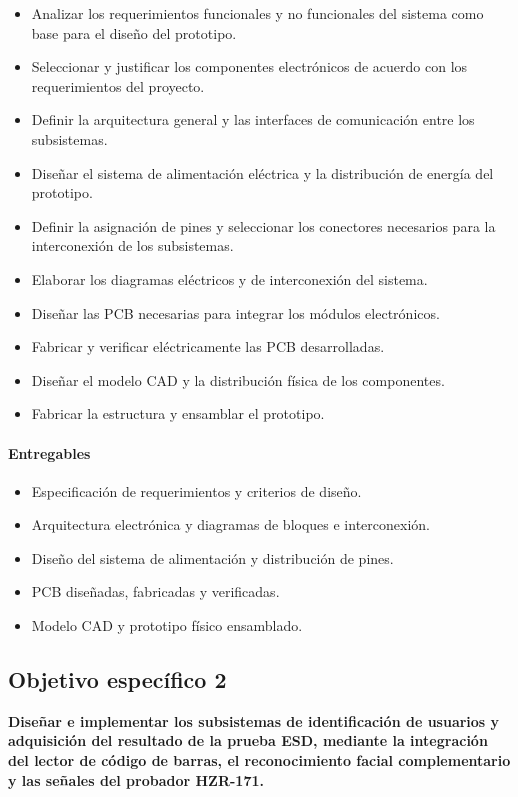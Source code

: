 \begin{itemize}
\item Analizar los requerimientos funcionales y 
no funcionales del sistema como base para el diseño del prototipo.
\item Seleccionar y justificar los componentes electrónicos de acuerdo con los
requerimientos del proyecto.
\item Definir la arquitectura general y las interfaces de comunicación entre
los subsistemas.
\item Diseñar el sistema de alimentación eléctrica y la distribución de energía
del prototipo.
\item Definir la asignación de pines y seleccionar los 
conectores necesarios para la interconexión de los subsistemas.
\item Elaborar los diagramas eléctricos y de interconexión del sistema.
\item Diseñar las PCB necesarias para integrar los módulos electrónicos.
\item Fabricar y verificar eléctricamente las PCB desarrolladas.
\item Diseñar el modelo CAD y la distribución física de los componentes.
\item Fabricar la estructura y ensamblar el prototipo.
\end{itemize}

\paragraph{Entregables}

\begin{itemize}
\item Especificación de requerimientos y criterios de diseño.
\item Arquitectura electrónica y diagramas de bloques e interconexión.
\item Diseño del sistema de alimentación y distribución de pines.
\item PCB diseñadas, fabricadas y verificadas.
\item Modelo CAD y prototipo físico ensamblado.
\end{itemize}


\subsection{Objetivo específico 2}

\textbf{Diseñar e implementar los subsistemas de identificación de usuarios y
adquisición del resultado de la prueba ESD, mediante la integración del lector
de código de barras, el reconocimiento facial complementario y las señales del
probador HZR-171.}

